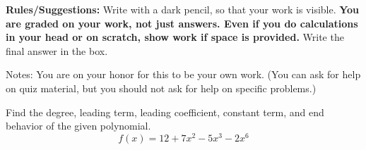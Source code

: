 \documentclass[11pt,addpoints,answers]{exam}
\begin{document}


{\small \noindent \textbf{Rules/Suggestions:} Write with a dark pencil, so that your work is visible.  \textbf{You are graded on your work, not just answers. Even if you do calculations in your head or on scratch, show work if space is provided. } Write the final answer in the box.

Notes: You are on your honor for this to be your own work.  (You can ask for help on quiz material, but you should not ask for help on specific problems.) }
\begin{questions}
\setlength\columnsep{1cm}
\question Find the degree, leading term, leading coefficient, constant term, and end behavior of the given polynomial.
\[f(x) = 12 + 7x^2 - 5x^3-2x^6\]
\end{questions}
\end{document}
